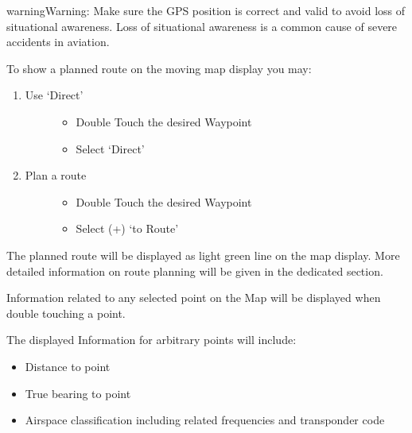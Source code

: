 \documentclass[letterpaper,10pt,english]{sphinxmanual}
\begin{document}
\begin{sphinxadmonition}{warning}{Warning:}
\sphinxAtStartPar
Make sure the GPS position is correct and valid to avoid loss of situational awareness. Loss of situational awareness is a common cause of severe accidents in aviation.
\end{sphinxadmonition}

\sphinxAtStartPar
To show a planned route on the moving map display you may:
\begin{enumerate}
%
\item {} \begin{description}
\item[{Use ‘Direct’}] \leavevmode\begin{itemize}
\item {} 
\sphinxAtStartPar
Double Touch the desired Waypoint

\item {} 
\sphinxAtStartPar
Select ‘Direct’

\end{itemize}

\end{description}

\item {} \begin{description}
\item[{Plan a route}] \leavevmode\begin{itemize}
\item {} 
\sphinxAtStartPar
Double Touch the desired Waypoint

\item {} 
\sphinxAtStartPar
Select (+) ‘to Route’

\end{itemize}

\end{description}

\end{enumerate}

\sphinxAtStartPar
The planned route will be displayed as light green line on the map display. More detailed information on route planning will be given in the dedicated section.

\sphinxAtStartPar
{}

\sphinxAtStartPar
Information related to any selected point on the Map will be displayed when double touching a point.

\sphinxAtStartPar
The displayed Information for arbitrary points will include:
\begin{itemize}
\item {} 
\sphinxAtStartPar
Distance to point

\item {} 
\sphinxAtStartPar
True bearing to point

\item {} 
\sphinxAtStartPar
Airspace classification including related frequencies and transponder code

\end{itemize}
\end{document}
